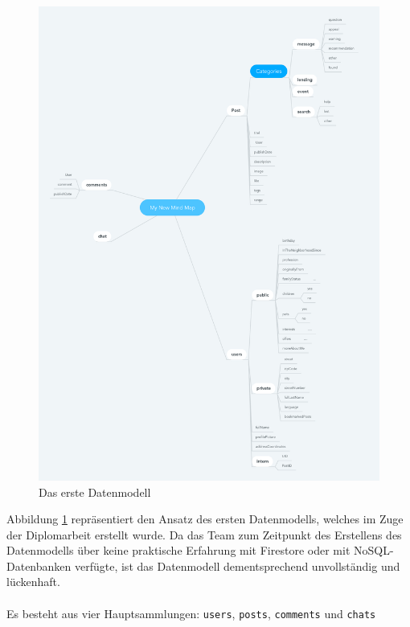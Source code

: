 \begin{figure}[H]
  \centering
  \includegraphics[width=1\textwidth]{pics/nochba-erd-old.png}
  \caption{Das erste Datenmodell}
  \label{fig:old-erd}
\end{figure}

Abbildung \ref{fig:old-erd} repräsentiert den Ansatz des ersten Datenmodells, welches im Zuge der Diplomarbeit erstellt wurde. Da das Team zum Zeitpunkt des Erstellens des Datenmodells über keine praktische Erfahrung mit Firestore oder mit NoSQL-Datenbanken verfügte, ist das Datenmodell dementsprechend unvollständig und lückenhaft.
\\\\
Es besteht aus vier Hauptsammlungen: \texttt{users}, \texttt{posts}, \texttt{comments} und \texttt{chats}
\\\\
